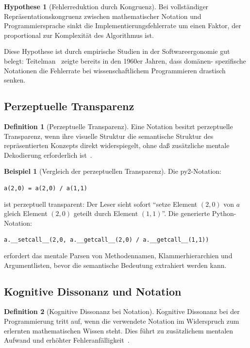 ﻿\documentclass[a4paper,12pt]{article}
\theoremstyle{definition}
\newtheorem{definition}{Definition}
\newtheorem{beispiel}{Beispiel}
\newtheorem{hypothese}{Hypothese}
\begin{document}
\begin{hypothese}[Fehlerreduktion durch Kongruenz]
	Bei vollst\"andiger Repr\"asentationskon\-gruenz zwischen mathematischer Notation
	und Programmiersprache sinkt die Implementierungsfehlerrate um einen Faktor,
	der proportional zur Komplexit\"at des Algorithmus ist.
\end{hypothese}

Diese Hypothese ist durch empirische Studien in der Softwareergonomie gut belegt:
Teitelman~\cite{teitelman1966} zeigte bereits in den 1960er Jahren, dass dom\"anen-
spezifische Notationen die Fehlerrate bei wissenschaftlichem Programmieren drastisch
senken.

\subsection{Perzeptuelle Transparenz}

\begin{definition}[Perzeptuelle Transparenz]
	Eine Notation besitzt perzeptuelle Transparenz, wenn ihre visuelle Struktur die
	semantische Struktur des repr\"asentierten Konzepts direkt widerspiegelt, ohne
	da\ss{} zus\"atzliche mentale Dekodierung erforderlich ist~\cite{blackwell2001}.
\end{definition}

\begin{beispiel}[Vergleich der perzeptuellen Transparenz]
	Die py2-Notation:
	\begin{center}
	\texttt{a(2,0) = a(2,0) / a(1,1)}
	\end{center}
	ist perzeptuell transparent: Der Leser sieht sofort ``setze Element $(2,0)$ von $a$
	gleich Element $(2,0)$ geteilt durch Element $(1,1)$''. Die generierte Python-Notation:
	\begin{center}
	\texttt{a.\_\_setcall\_\_(2,0, a.\_\_getcall\_\_(2,0) / a.\_\_getcall\_\_(1,1))}
	\end{center}
	erfordert das mentale Parsen von Methodennamen, Klammerhierarchien und
	Argumentlisten, bevor die semantische Bedeutung extrahiert werden kann.
\end{beispiel}

\subsection{Kognitive Dissonanz und Notation}

\begin{definition}[Kognitive Dissonanz bei Notation]
	Kognitive Dissonanz bei der Programmierung tritt auf, wenn die verwendete Notation
	im Widerspruch zum erlernten mathematischen Wissen steht. Dies f\"uhrt zu
	zus\"atzlichem mentalen Aufwand und erh\"ohter Fehleranf\"alligkeit~\cite{festinger1957}.
\end{definition}
\end{document}
